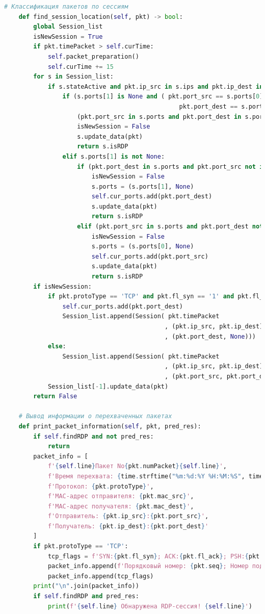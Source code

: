 \documentclass[bachelor, och, coursework]{SCWorks}
\begin{document}
\begin{lstlisting}[language=Python]
    # Классификация пакетов по сессиям
    def find_session_location(self, pkt) -> bool:
        global Session_list
        isNewSession = True
        if pkt.timePacket > self.curTime:
            self.packet_preparation()
            self.curTime += 15
        for s in Session_list:
            if s.stateActive and pkt.ip_src in s.ips and pkt.ip_dest in s.ips:
                if (s.ports[1] is None and ( pkt.port_src == s.ports[0] or \
                                                pkt.port_dest == s.ports[0]) ) or \
                    (pkt.port_src in s.ports and pkt.port_dest in s.ports):
                    isNewSession = False
                    s.update_data(pkt)
                    return s.isRDP
                elif s.ports[1] is not None:
                    if (pkt.port_dest in s.ports and pkt.port_src not in s.ports):
                        isNewSession = False
                        s.ports = (s.ports[1], None)
                        self.cur_ports.add(pkt.port_dest)
                        s.update_data(pkt)
                        return s.isRDP
                    elif (pkt.port_src in s.ports and pkt.port_dest not in s.ports):
                        isNewSession = False
                        s.ports = (s.ports[0], None)
                        self.cur_ports.add(pkt.port_src)
                        s.update_data(pkt)
                        return s.isRDP
        if isNewSession:
            if pkt.protoType == 'TCP' and pkt.fl_syn == '1' and pkt.fl_ack == '0':
                self.cur_ports.add(pkt.port_dest)
                Session_list.append(Session( pkt.timePacket
                                            , (pkt.ip_src, pkt.ip_dest)
                                            , (pkt.port_dest, None)))
            else:
                Session_list.append(Session( pkt.timePacket
                                            , (pkt.ip_src, pkt.ip_dest)
                                            , (pkt.port_src, pkt.port_dest)))
            Session_list[-1].update_data(pkt)
        return False

    # Вывод информации о перехваченных пакетах
    def print_packet_information(self, pkt, pred_res):
        if self.findRDP and not pred_res:
            return
        packet_info = [
            f'{self.line}Пакет No{pkt.numPacket}{self.line}',
            f'Время перехвата: {time.strftime("%m:%d:%Y %H:%M:%S", time.localtime(pkt.timePacket))}',
            f'Протокол: {pkt.protoType}',
            f'MAC-адрес отправителя: {pkt.mac_src}',
            f'MAC-адрес получателя: {pkt.mac_dest}',
            f'Отправитель: {pkt.ip_src}:{pkt.port_src}',
            f'Получатель: {pkt.ip_dest}:{pkt.port_dest}'
        ]
        if pkt.protoType == 'TCP':
            tcp_flags = f'SYN:{pkt.fl_syn}; ACK:{pkt.fl_ack}; PSH:{pkt.fl_psh}; RST:{pkt.fl_rst}; FIN:{pkt.fl_fin}'
            packet_info.append(f'Порядковый номер: {pkt.seq}; Номер подтверждения: {pkt.ack}')
            packet_info.append(tcp_flags)
        print("\n".join(packet_info))
        if self.findRDP and pred_res:
            print(f'{self.line} Обнаружена RDP-сессия! {self.line}')
    

\end{lstlisting}
\end{document}
